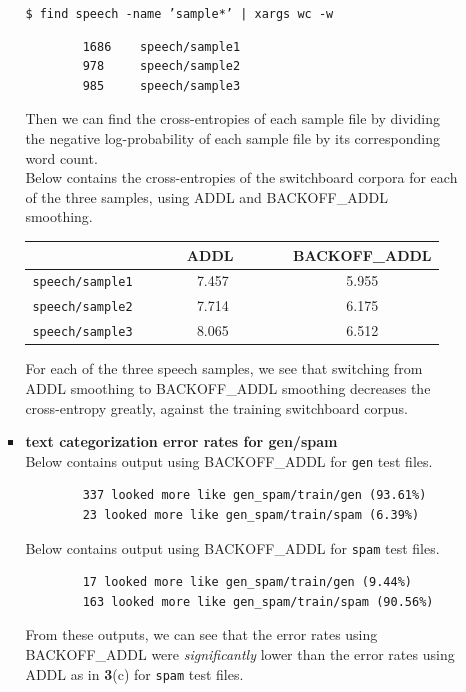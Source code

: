 \documentclass[11pt]{article}
\newcommand{\codebox}[1]{\colorbox{codegray}{\texttt{#1}}}
\begin{document}
\begin{enumerate}
\begin{enumerate}[label=(\alph*)]
\begin{itemize}
				\codebox{\$ find speech -name 'sample*' | xargs wc -w \hspace{49mm}}
				\begin{lstlisting}
		1686    speech/sample1
		978     speech/sample2
		985     speech/sample3
				\end{lstlisting}

				Then we can find the cross-entropies of each sample file by dividing the negative log-probability of each sample file by its corresponding word count. \\
				
				Below contains the cross-entropies of the switchboard corpora for each of the three samples, using ADDL and BACKOFF\_ADDL smoothing. \\

				\begin{center}\begin{tabular}{| r || c | c |}
					\hline
									& \ \ \ \ \ ADDL \ \ \ \ \ & BACKOFF\_ADDL \\
					\hline \hline
					\texttt{speech/sample1} & 7.457 & 5.955 		\\
					\texttt{speech/sample2} & 7.714 & 6.175 		\\
					\texttt{speech/sample3} & 8.065 & 6.512 		\\
					\hline
				
				\end{tabular}\end{center} \vspace{8pt}

				For each of the three speech samples, we see that switching from ADDL smoothing to BACKOFF\_ADDL smoothing decreases the cross-entropy greatly, against the training switchboard corpus.

			\item[] \hspace{-24pt} 
				\textbf{text categorization error rates for gen/spam} \vspace{4pt} \\
				Below contains output using BACKOFF\_ADDL for \texttt{gen} test files.
				\begin{lstlisting}
		337 looked more like gen_spam/train/gen (93.61%)
		23 looked more like gen_spam/train/spam (6.39%)
				\end{lstlisting}

				Below contains output using BACKOFF\_ADDL for \texttt{spam} test files.
				\begin{lstlisting}
		17 looked more like gen_spam/train/gen (9.44%)
		163 looked more like gen_spam/train/spam (90.56%)
				\end{lstlisting}
				From these outputs, we can see that the error rates using BACKOFF\_ADDL were \textit{significantly} lower than the error rates using ADDL as in \textbf{3}(c) for \texttt{spam} test files. \vspace{4pt}


\end{itemize}
\end{enumerate}
\end{enumerate}
\end{document}
